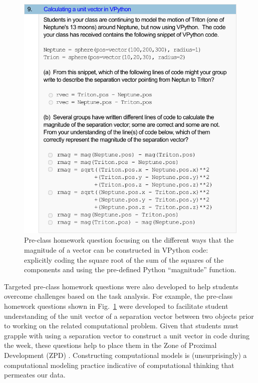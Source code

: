 \documentclass{msuphddissertation}
\begin{document}
\begin{doublespace}
\begin{figure}[ht]\centering
\includegraphics[scale=0.75]{images/CH3PreClassQuestion.pdf}
\caption{Pre-class homework question focusing on the different ways that the magnitude of a vector can be constructed in VPython code: explicitly coding the square root of the sum of the squares of the components and using the pre-defined Python ``magnitude'' function.}\label{CH3:PreClassQuestion}
\end{figure} 

Targeted pre-class homework questions were also developed to help students overcome challenges based on the task analysis.  For example, the pre-class homework questions shown in Fig.~\ref{CH3:PreClassQuestion} were developed to facilitate student understanding of the unit vector of a separation vector between two objects prior to working on the related computational problem.  Given that students must grapple with using a separation vector to construct a unit vector in code during the week, these questions help to place them in the Zone of Proximal Development (ZPD) \cite{Vygotsky1980}.  Constructing computational models is (unsurprisingly) a computational modeling practice indicative of computational thinking that permeates our data.


\end{doublespace}
\end{document}
